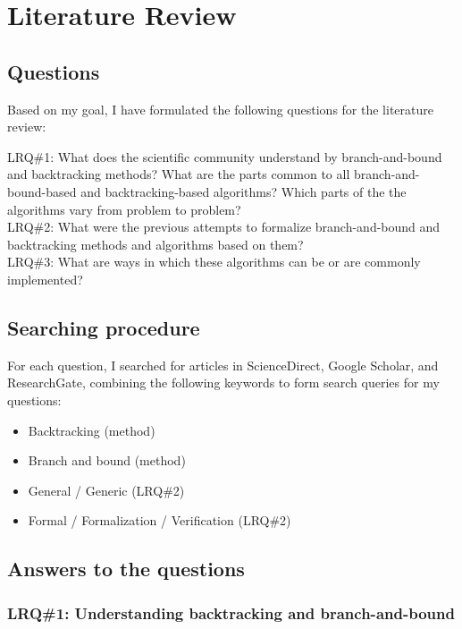 \chapter{Literature Review}
\label{chap:lr}

\section{Questions}

Based on my goal, I have formulated the following questions for the literature review:

LRQ\#1: What does the scientific community understand by branch-and-bound and backtracking methods?
What are the parts common to all branch-and-bound-based and backtracking-based algorithms?
Which parts of the the algorithms vary from problem to problem? \\

LRQ\#2: What were the previous attempts to formalize branch-and-bound and backtracking methods
and algorithms based on them? \\

LRQ\#3: What are ways in which these algorithms can be or are commonly implemented? \\

\section{Searching procedure}

For each question, I searched for articles in ScienceDirect,
Google Scholar, and ResearchGate, combining the following keywords to form search queries
for my questions:

\begin{itemize}
    \item Backtracking (method)
    \item Branch and bound (method)
    \item General / Generic (LRQ\#2)
    \item Formal / Formalization / Verification (LRQ\#2)
\end{itemize}

\section{Answers to the questions}

\subsection{LRQ\#1: Understanding backtracking and branch-and-bound}

